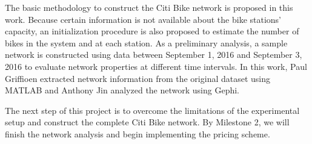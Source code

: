 \documentclass[times, 10pt,twocolumn]{article}
\begin{document}
The basic methodology to construct the Citi Bike network is proposed in this work. Because certain information is not available about the bike stations' capacity, an initialization procedure is also proposed to estimate the number of bikes in the system and at each station. As a preliminary analysis, a sample network is constructed using data between September 1, 2016 and September 3, 2016 to evaluate network properties at different time intervals. In this work, Paul Griffioen extracted network information from the original dataset using MATLAB and Anthony Jin analyzed the network using Gephi.

The next step of this project is to overcome the limitations of the experimental setup and construct the complete Citi Bike network. By Milestone 2, we will finish the network analysis and begin implementing the pricing scheme.
\end{document}
